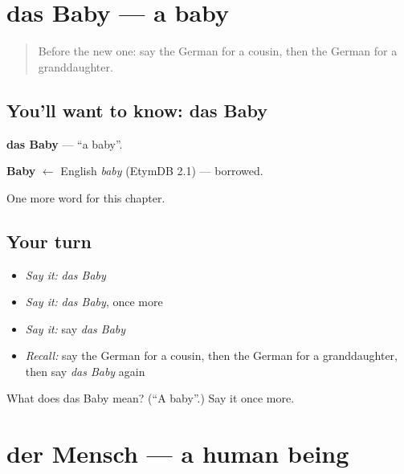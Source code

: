 \section[das Baby]{das Baby — a baby}

\label{lesson:GE-C164-baby}



\begin{quote}
Before the new one: say the German for a cousin, then the German for a granddaughter.
\end{quote}

\subsection*{You'll want to know: das Baby}
\textbf{das Baby} — \textquotedblleft{}a baby\textquotedblright{}.

\begin{cousinweb}
\textbf{Baby} $\leftarrow$ English \emph{baby} (EtymDB 2.1) — borrowed.
\end{cousinweb}

\begin{grammarlens}[title={What you've built}]
One more word for this chapter.
\end{grammarlens}

\subsection*{Your turn}
\begin{itemize}
\raggedright
  \item \emph{Say it:} \emph{das Baby}
  \item \emph{Say it:} \emph{das Baby}, once more
  \item \emph{Say it:} say \emph{das Baby}
  \item \emph{Recall:} say the German for a cousin, then the German for a granddaughter, then say \emph{das Baby} again
\end{itemize}

\begin{tcolorbox}[breakable,colback=teal!4,colframe=teal!35!black,title={Before you move on}]
What does das Baby mean? (\textquotedblleft{}A baby\textquotedblright{}.) Say it once more.
\end{tcolorbox}
\section[der Mensch]{der Mensch — a human being}

